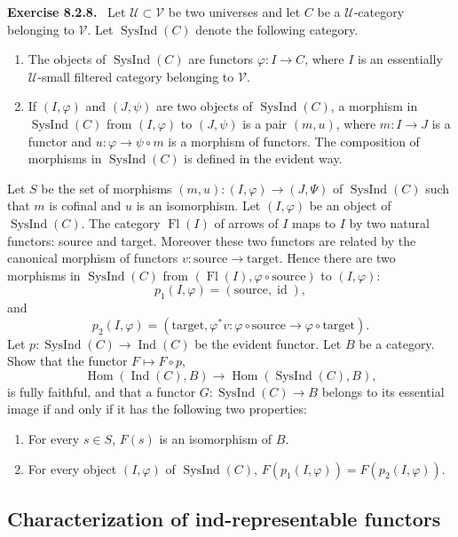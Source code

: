 \documentclass[11pt]{article}
\newcommand{\U}{\mathcal{U}}
\newcommand{\V}{\mathcal{V}}
\newcommand{\Fl}{\operatorname{Fl}}
\newcommand{\Ind}{\operatorname{Ind}}
\newcommand{\SysInd}{\operatorname{SysInd}}
\newcommand{\id}{\operatorname{id}}
\newcommand{\Hhom}{\operatorname{Hom}}
\newenvironment{statement}[1]{\par\medskip\noindent\textbf{#1.}\ }{\par\medskip}
\begin{document}
\begin{statement}{Exercise 8.2.8}
Let $\U\subset\V$ be two universes and let $C$ be a $\U$-category belonging to $\V$. Let $\SysInd(C)$ denote the following category.
\begin{enumerate}[label=\alph*)]
\item The objects of $\SysInd(C)$ are functors $\varphi:I\to C$, where $I$ is an essentially $\U$-small filtered category belonging to $\V$.
\item If $(I,\varphi)$ and $(J,\psi)$ are two objects of $\SysInd(C)$, a morphism in $\SysInd(C)$ from $(I,\varphi)$ to $(J,\psi)$ is a pair $(m,u)$, where $m:I\to J$ is a functor and $u:\varphi\to\psi\circ m$ is a morphism of functors. The composition of morphisms in $\SysInd(C)$ is defined in the evident way.
\end{enumerate}
\end{statement}

Let $S$ be the set of morphisms $(m,u):(I,\varphi)\to(J,\Psi)$ of $\SysInd(C)$ such that $m$ is cofinal and $u$ is an isomorphism. Let $(I,\varphi)$ be an object of $\SysInd(C)$. The category $\Fl(I)$ of arrows of $I$ maps to $I$ by two natural functors: source and target. Moreover these two functors are related by the canonical morphism of functors $v:\mathrm{source}\to\mathrm{target}$. Hence there are two morphisms in $\SysInd(C)$ from $(\Fl(I),\varphi\circ\mathrm{source})$ to $(I,\varphi)$:
\[
p_1(I,\varphi)=(\mathrm{source},\id),
\]
and
\[
p_2(I,\varphi)=(\mathrm{target},\varphi^*v:\varphi\circ\mathrm{source}\to\varphi\circ\mathrm{target}).
\]
Let $p:\SysInd(C)\to\Ind(C)$ be the evident functor. Let $B$ be a category. Show that the functor $F\mapsto F\circ p$,
\[
\Hhom(\Ind(C),B)\longrightarrow\Hhom(\SysInd(C),B),
\]
is fully faithful, and that a functor $G:\SysInd(C)\to B$ belongs to its essential image if and only if it has the following two properties:
\begin{enumerate}[label=\arabic*)]
\item For every $s\in S$, $F(s)$ is an isomorphism of $B$.
\item For every object $(I,\varphi)$ of $\SysInd(C)$, $F(p_1(I,\varphi))=F(p_2(I,\varphi))$.
\end{enumerate}

\subsection{Characterization of ind-representable functors}
\end{document}
